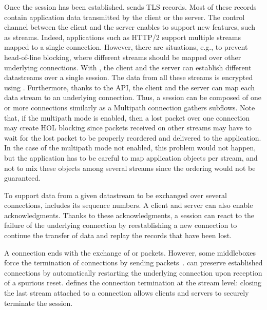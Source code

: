 Once the \tcpls session has been established, \tcpls sends TLS records. Most of
these records contain application data transmitted by the client or
the server. The control channel between the client and the
server enables \tcpls to support new features, such as streams. Indeed, applications such as HTTP/2 support multiple streams mapped to a single
\tcp connection. However, there are situations, e.g., to prevent head-of-line
blocking, where different streams should be mapped over other underlying \tcp
connections. With \tcpls, the client and the server can establish different
datastreams over a single \tcpls session. The data from all these streams is
encrypted using \tls. Furthermore, thanks to the \tcpls API, the client and the
server can map each data stream to an underlying \tcp connection.
Thus, a \tcpls session can be composed of one or more \tcp connections
similarly as a Multipath \tcp connection gathers subflows. Note that, if
the multipath mode is enabled, then a lost packet over one \tcp connection may
create HOL blocking since packets received on other streams may have to wait for
the lost packet to be properly reordered and delivered to the application. In
the case of the multipath mode not enabled, this problem would not happen, but
the application has to be careful to map application objects per stream, and not to
mix these objects among several streams since the ordering would not be
guaranteed.

To support data from a given datastream to be exchanged over several \tcp
connections, \tcpls includes its sequence numbers. A client and server can also
enable acknowledgments. Thanks to these \tcpls
acknowledgments, a \tcpls session can react to the failure of the underlying
\tcp connection by reestablishing a new \tcp connection to continue the transfer
of data and replay the records that have been lost.

A \tcp connection ends with the exchange of \fin or \rst packets. However,
some middleboxes force the termination of \tcp connections
by sending \rst packets~\cite{rfc3360,weaver2009detecting}. \tcpls
can preserve established connections by automatically restarting
the underlying \tcp connection upon reception of a spurious reset. \tcpls
defines the connection termination at the stream level: closing the last stream
attached to a \tcp connection allows clients and servers to securely
terminate the \tcpls session.


